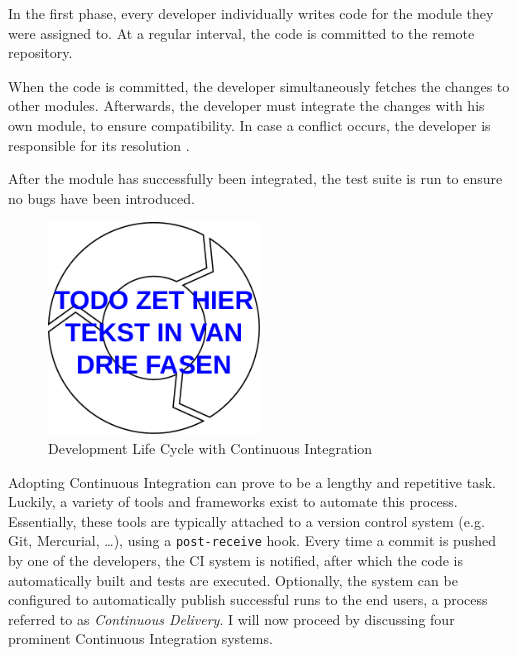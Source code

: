 \begin{enumerate}
	 In the first phase, every developer individually writes code for the module they were assigned to. At a regular interval, the code is committed to the remote repository.
	
	 When the code is committed, the developer simultaneously fetches the changes to other modules. Afterwards, the developer must integrate the changes with his own module, to ensure compatibility. In case a conflict occurs, the developer is responsible for its resolution \cite{martin2014}.
	
	 After the module has successfully been integrated, the test suite is run to ensure no bugs have been introduced.
\end{enumerate}

\begin{figure}[htbp!]
	\centering
	\includegraphics[width=0.5\textwidth]{assets/ci-lifecycle.pdf}
	\caption{Development Life Cycle with Continuous Integration}
	\label{fig:agile-ci-lifecycle}
\end{figure}

\noindent Adopting Continuous Integration can prove to be a lengthy and repetitive task. Luckily, a variety of tools and frameworks exist to automate this process. Essentially, these tools are typically attached to a version control system (e.g. Git, Mercurial, \dots), using a \texttt{post-receive} hook. Every time a commit is pushed by one of the developers, the CI system is notified, after which the code is automatically built and tests are executed. Optionally, the system can be configured to automatically publish successful runs to the end users, a process referred to as \emph{Continuous Delivery}. I will now proceed by discussing four prominent Continuous Integration systems.

